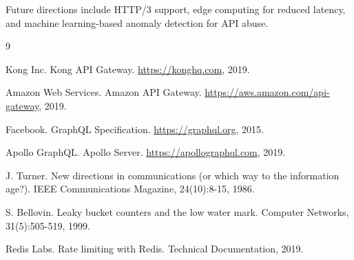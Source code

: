 \documentclass[11pt,a4paper]{article}
\begin{document}
Future directions include HTTP/3 support, edge computing for reduced latency, and machine learning-based anomaly detection for API abuse.


\begin{thebibliography}{9}

Kong Inc. Kong API Gateway. \url{https://konghq.com}, 2019.

Amazon Web Services. Amazon API Gateway. \url{https://aws.amazon.com/api-gateway}, 2019.

Facebook. GraphQL Specification. \url{https://graphql.org}, 2015.

Apollo GraphQL. Apollo Server. \url{https://apollographql.com}, 2019.

J. Turner. New directions in communications (or which way to the information age?). IEEE Communications Magazine, 24(10):8-15, 1986.

S. Bellovin. Leaky bucket counters and the low water mark. Computer Networks, 31(5):505-519, 1999.

Redis Labs. Rate limiting with Redis. Technical Documentation, 2019.

\end{thebibliography}
\end{document}
